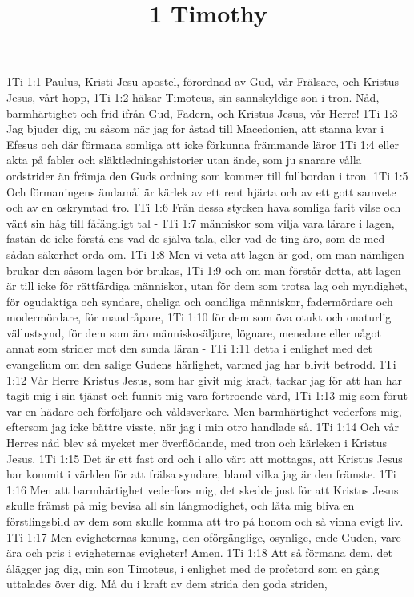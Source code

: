 

\title{1 Timothy}

1Ti 1:1  Paulus, Kristi Jesu apostel, förordnad av Gud, vår Frälsare, och Kristus Jesus, vårt hopp,
1Ti 1:2  hälsar Timoteus, sin sannskyldige son i tron. Nåd, barmhärtighet och frid ifrån Gud, Fadern, och Kristus Jesus, vår Herre!
1Ti 1:3  Jag bjuder dig, nu såsom när jag for åstad till Macedonien, att stanna kvar i Efesus och där förmana somliga att icke förkunna främmande läror
1Ti 1:4  eller akta på fabler och släktledningshistorier utan ände, som ju snarare vålla ordstrider än främja den Guds ordning som kommer till fullbordan i tron.
1Ti 1:5  Och förmaningens ändamål är kärlek av ett rent hjärta och av ett gott samvete och av en oskrymtad tro.
1Ti 1:6  Från dessa stycken hava somliga farit vilse och vänt sin håg till fåfängligt tal -
1Ti 1:7  människor som vilja vara lärare i lagen, fastän de icke förstå ens vad de själva tala, eller vad de ting äro, som de med sådan säkerhet orda om.
1Ti 1:8  Men vi veta att lagen är god, om man nämligen brukar den såsom lagen bör brukas,
1Ti 1:9  och om man förstår detta, att lagen är till icke för rättfärdiga människor, utan för dem som trotsa lag och myndighet, för ogudaktiga och syndare, oheliga och oandliga människor, fadermördare och modermördare, för mandråpare,
1Ti 1:10  för dem som öva otukt och onaturlig vällustsynd, för dem som äro människosäljare, lögnare, menedare eller något annat som strider mot den sunda läran -
1Ti 1:11  detta i enlighet med det evangelium om den salige Gudens härlighet, varmed jag har blivit betrodd.
1Ti 1:12  Vår Herre Kristus Jesus, som har givit mig kraft, tackar jag för att han har tagit mig i sin tjänst och funnit mig vara förtroende värd,
1Ti 1:13  mig som förut var en hädare och förföljare och våldsverkare. Men barmhärtighet vederfors mig, eftersom jag icke bättre visste, när jag i min otro handlade så.
1Ti 1:14  Och vår Herres nåd blev så mycket mer överflödande, med tron och kärleken i Kristus Jesus.
1Ti 1:15  Det är ett fast ord och i allo värt att mottagas, att Kristus Jesus har kommit i världen för att frälsa syndare, bland vilka jag är den främste.
1Ti 1:16  Men att barmhärtighet vederfors mig, det skedde just för att Kristus Jesus skulle främst på mig bevisa all sin långmodighet, och låta mig bliva en förstlingsbild av dem som skulle komma att tro på honom och så vinna evigt liv.
1Ti 1:17  Men evigheternas konung, den oförgänglige, osynlige, ende Guden, vare ära och pris i evigheternas evigheter! Amen.
1Ti 1:18  Att så förmana dem, det ålägger jag dig, min son Timoteus, i enlighet med de profetord som en gång uttalades över dig. Må du i kraft av dem strida den goda striden,
